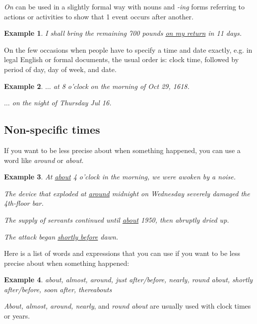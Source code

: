 \documentclass[oneside]{book}
\numberwithin{equation}{section}
\newtheorem{example}{Example}[section]
\begin{document}
%
\noindent{} \textit{On} can be used in a slightly formal way with nouns and \textit{-ing} forms referring to actions or activities to show that 1 event occurs after another.
\begin{example}
    I shall bring the remaining 700 pounds \underline{on my return} in 11 days.
\end{example}
%
\noindent{} On the few occasions when people have to specify a time and date exactly, e.g. in legal English or formal documents, the usual order is: clock time, followed by period of day, day of week, and date.
\begin{example}
    $\ldots$ at 8 o'clock on the morning of Oct 29, 1618.
    
    $\ldots$ on the night of Thursday Jul 16.
\end{example}

\subsection{Non-specific times}
\noindent{} If you want to be less precise about when something happened, you can use a word like \textit{around} or \textit{about}.
\begin{example}
    At \underline{about} 4 o'clock in the morning, we were awoken by a noise.
    
    The device that exploded at \underline{around} midnight on Wednesday severely damaged the 4th-floor bar.
    
    The supply of servants continued until \underline{about} 1950, then abruptly dried up.
    
    The attack began \underline{shortly before} dawn.
\end{example}
Here is a list of words and expressions that you can use if you want to be less precise about when something happened:
\begin{example}
    about, almost, around, just after/before, nearly, round about, shortly after/before, soon after, thereabouts
\end{example}
\textit{About, almost, around, nearly}, and \textit{round about} are usually used with clock times or years.
\end{document}
